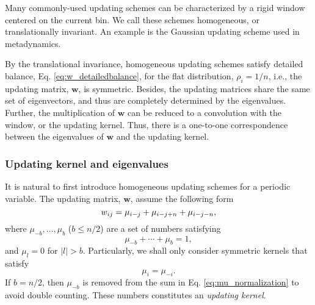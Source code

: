 \documentclass[reprint, floatfix]{revtex4-1}
\begin{document}
Many commonly-used updating schemes
can be characterized by a rigid window
centered on the current bin.
%
We call these schemes homogeneous,
or translationally invariant.
%
An example is the Gaussian updating scheme
used in metadynamics.

By the translational invariance,
homogeneous updating schemes
satisfy detailed balance,
Eq. \eqref{eq:w_detailedbalance},
for the flat distribution, $\rho_i = 1/n$,
i.e., the updating matrix, $\mathbf w$,
is symmetric.
%
Besides, the updating matrices
share the same set of eigenvectors,
and thus are completely determined
by the eigenvalues.
%
Further, the multiplication of $\mathbf w$
can be reduced to a convolution with the window,
or the updating kernel.
%
Thus,
there is a one-to-one correspondence between
the eigenvalues of $\mathbf w$
and the updating kernel.



\subsubsection{\label{sec:bandkernel}
Updating kernel and eigenvalues}






It is natural to first introduce homogeneous updating schemes
for a periodic variable\cite{dama2014}.
%
The updating matrix, $\mathbf w$,
assume the following form
%
\begin{equation}
  w_{ij}
  =
  \mu_{i-j}
  +
  \mu_{i-j+n}
  +
  \mu_{i-j-n}
  ,
\notag
\end{equation}
%
where
$\mu_{-b}, \dots, \mu_b$ ($b \le n/2$)
are a set of numbers satisfying
%
\begin{equation}
  \mu_{-b} + \cdots + \mu_b = 1
  ,
\label{eq:mu_normalization}
\end{equation}
%
and $\mu_l = 0$ for $|l| > b$.
%
Particularly,
we shall only consider symmetric kernels
that satisfy
%
\begin{equation}
  \mu_i = \mu_{-i}
  .
\label{eq:mu_symm}
\end{equation}
%
If $b = n/2$, then $\mu_{-b}$ is removed
from the sum in Eq. \eqref{eq:mu_normalization}
to avoid double counting.
%
These numbers constitutes an \emph{updating kernel}.
\end{document}
